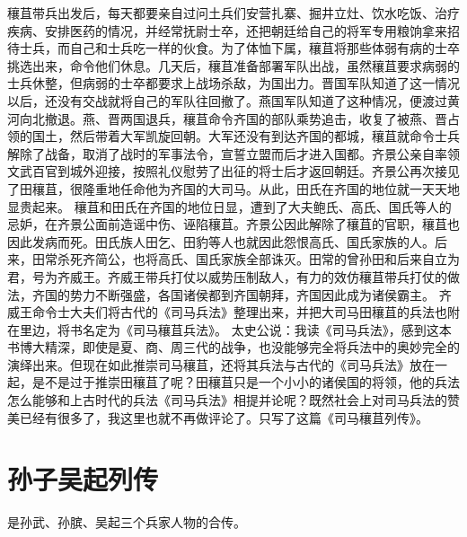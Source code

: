 \documentclass[12pt,UTF8]{ctexbook}
\begin{document}
穰苴带兵出发后，每天都要亲自过问土兵们安营扎寨、掘井立灶、饮水吃饭、治疗疾病、安排医药的情况，并经常抚尉士卒，还把朝廷给自己的将军专用粮饷拿来招待士兵，而自己和士兵吃一样的伙食。为了体恤下属，穰苴将那些体弱有病的士卒挑选出来，命令他们休息。几天后，穰苴准备部署军队出战，虽然穰苴要求病弱的士兵休整，但病弱的士卒都要求上战场杀敌，为国出力。晋国军队知道了这一情况以后，还没有交战就将自己的军队往回撤了。燕国军队知道了这种情况，便渡过黄河向北撤退。燕、晋两国退兵，穰苴命令齐国的部队乘势追击，收复了被燕、晋占领的国土，然后带着大军凯旋回朝。大军还没有到达齐国的都城，穰苴就命令士兵解除了战备，取消了战时的军事法令，宣誓立盟而后才进入国都。齐景公亲自率领文武百官到城外迎接，按照礼仪慰劳了出征的将士后才返回朝廷。齐景公再次接见了田穰苴，很隆重地任命他为齐国的大司马。从此，田氏在齐国的地位就一天天地显贵起来。
穰苴和田氏在齐国的地位日显，遭到了大夫鲍氏、高氏、国氏等人的忌妒，在齐景公面前造谣中伤、诬陷穰苴。齐景公因此解除了穰苴的官职，穰苴也因此发病而死。田氏族人田乞、田豹等人也就因此怨恨高氏、国氏家族的人。后来，田常杀死齐简公，也将高氏、国氏家族全部诛灭。田常的曾孙田和后来自立为君，号为齐威王。齐威王带兵打仗以威势压制敌人，有力的效仿穰苴带兵打仗的做法，齐国的势力不断强盛，各国诸侯都到齐国朝拜，齐国因此成为诸侯霸主。
齐威王命令士大夫们将古代的《司马兵法》整理出来，并把大司马田穰苴的兵法也附在里边，将书名定为《司马穰苴兵法》。
太史公说：我读《司马兵法》，感到这本书博大精深，即使是夏、商、周三代的战争，也没能够完全将兵法中的奥妙完全的演绎出来。但现在如此推崇司马穰苴，还将其兵法与古代的《司马兵法》放在一起，是不是过于推崇田穰苴了呢？田穰苴只是一个小小的诸侯国的将领，他的兵法怎么能够和上古时代的兵法《司马兵法》相提并论呢？既然社会上对司马兵法的赞美已经有很多了，我这里也就不再做评论了。只写了这篇《司马穰苴列传》。



\chapter{孙子吴起列传}

是孙武、孙膑、吴起三个兵家人物的合传。
\end{document}
